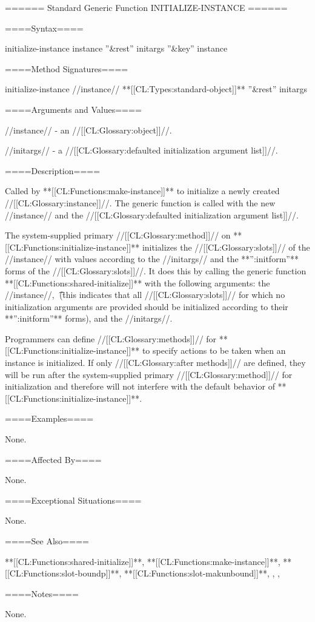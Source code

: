 ====== Standard Generic Function INITIALIZE-INSTANCE ======

====Syntax====


\DefgenWithValues initialize-instance {instance ''&rest'' initargs ''&key'' {\allowotherkeys}} {instance}


====Method Signatures====

\Defmeth initialize-instance {//instance// **[[CL:Types:standard-object]]** ''&rest'' initargs}

====Arguments and Values====

//instance// - an //[[CL:Glossary:object]]//.

//initargs// - a //[[CL:Glossary:defaulted initialization argument list]]//.

====Description====

Called by **[[CL:Functions:make-instance]]** to initialize a newly created //[[CL:Glossary:instance]]//. The generic function is called with the new //instance// and the //[[CL:Glossary:defaulted initialization argument list]]//.

The system-supplied primary //[[CL:Glossary:method]]// on **[[CL:Functions:initialize-instance]]** initializes the //[[CL:Glossary:slots]]// of the //instance// with values according to the //initargs// and the **'':initform''** forms of the //[[CL:Glossary:slots]]//. It does this by calling the generic function **[[CL:Functions:shared-initialize]]** with the following arguments: the //instance//, \t\ (this indicates that all //[[CL:Glossary:slots]]// for which no initialization arguments are provided should be initialized according to their **'':initform''** forms), and the //initargs//.

Programmers can define //[[CL:Glossary:methods]]// for **[[CL:Functions:initialize-instance]]** to specify actions to be taken when an instance is initialized. If only //[[CL:Glossary:after methods]]// are defined, they will be run after the system-supplied primary //[[CL:Glossary:method]]// for initialization and therefore will not interfere with the default behavior of **[[CL:Functions:initialize-instance]]**.

====Examples====

None.

====Affected By====

None.

====Exceptional Situations====

None.

====See Also====

**[[CL:Functions:shared-initialize]]**, **[[CL:Functions:make-instance]]**, **[[CL:Functions:slot-boundp]]**, **[[CL:Functions:slot-makunbound]]**, {\secref\ObjectCreationAndInit}, {\secref\InitargRules}, {\secref\DeclaringInitargValidity}

====Notes====

None.


